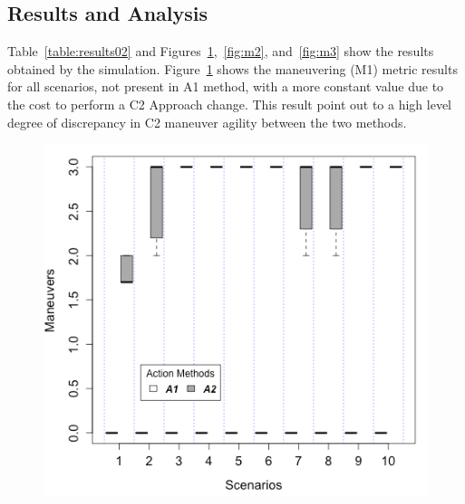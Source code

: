 \subsection{Results and Analysis}

Table~\ref{table:results02} and Figures~\ref{fig:m1},~\ref{fig:m2}, and~\ref{fig:m3} show the results obtained by the simulation. Figure~\ref{fig:m1} shows the maneuvering (M1) metric results for all scenarios, not present in A1 method, with a more constant value due to the cost to perform a C2 Approach change. This result point out to a high level degree of discrepancy in C2 maneuver agility between the two methods.

\begin{figure}[ht]
\centering
\begin{minipage}{.5\textwidth}
    \centering
    \small
    \fontsize{7}{7}\selectfont
    \label{table:results02}
    
\end{minipage}%
\begin{minipage}{.5\textwidth}
  \centering
  \includegraphics[width=0.95\linewidth]{figures/graphs/Boxplot_M2.png}
  \label{fig:m1}
\end{minipage}
\end{figure}

